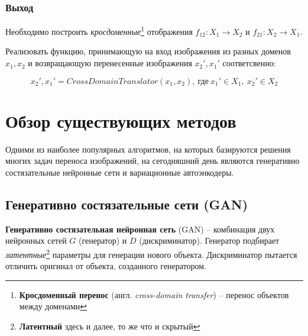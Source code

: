 \documentclass[11pt,a4paper]{extarticle}
\begin{document}
		\subsubsection*{Выход}
			Необходимо построить \textit{кросдоменные}\footnote{
				\textbf{Кросдоменный перенос} (англ. \textit{cross-domain transfer}) -- перенос объектов между доменами 
			} отображения \(f_{12}\!: X_{1} \longrightarrow X_{2}\) и \(f_{21}\!: X_{2} \longrightarrow X_{1}\).
			
			\noindent
			Реализовать функцию, принимающую на вход изображения из разных доменов
			\(x_{1}, x_{2}\) и возвращающую перенесенные изображения \(x_{2}', x_{1}'\) соответсвенно: 

			\begin{equation}
					x_{2}', x_{1}'  = CrossDomainTranslator(x_{1}, x_{2}),\ \text{где}\ x_{1}' \in X_{1},\ x_{2}' \in X_{2}
			\end{equation}
	
	\newpage
	\section{Обзор существующих методов}
		
		Одними из наиболее популярных алгоритмов, на которых базируются решения многих задач переноса изображений, на сегодняшний день являются
		генеративно состязательные нейронные сети и вариационные автоэнкодеры.

		\subsection{Генеративно состязательные сети (GAN)}		

			\textbf{Генеративно состязательная нейронная сеть} (GAN) -- комбинация двух нейронных сетей $G$ (генератор) и $D$ (дискриминатор).
			Генератор подбирает \textit{латентные}\footnote{
				\textbf{Латентный} здесь и далее, то же что и скрытый
			} параметры для генерации нового объекта.
			Дискриминатор пытается отличить оригинал от объекта, созданного генератором.
			
\end{document}
